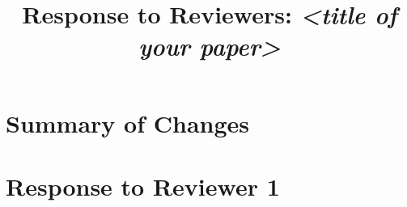 \documentclass[conference,onecolumn,a4paper]{IEEEtran}
\newif\ifguidance
\newcommand{\guidance}[1]{\ifguidance{\itshape\small #1\par\medskip}\fi}
\begin{document}
\title{Response to Reviewers: \textit{<title of your paper>}}

\author{
}

\maketitle


\guidance{Every italic note in this document is guidance.
Delete each one as you write its section, then set
\texttt{\textbackslash guidancefalse} in the preamble: the PDF you submit
carries no guidance.}

\section*{Summary of Changes}

\guidance{One paragraph here, 300 words at most. What changed in the paper
between v1 and the final version, and why. A reader should be able to stop at
the end of this paragraph and know an overview of what you updated.}

\section*{Response to Reviewer 1}

\guidance{One numbered block per comment in the review, in the shape below.
Every comment gets its own block, including the ones you changed nothing for.}
\end{document}
